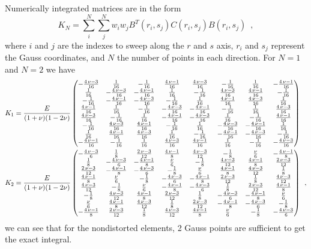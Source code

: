 \documentclass[12pt,letterpaper]{article}
\begin{document}
Numerically integrated matrices are in the form
\[ K_N = \sum_{i}^{N}\sum_{j}^{N} w_{i}w_{j}B^T(r_i,s_j) C(r_i,s_j) B(r_i,s_j) \enspace , \]
where $i$ and $j$ are the indexes to sweep along the $r$ and $s$ axis, $r_i$ and $s_j$ represent the Gauss coordinates, and $N$ the number of points in each direction. For $N=1$ and $N=2$ we have
\begin{align*}
K_1 &= \frac{E}{(1+\nu)(1-2\nu)}\begin{pmatrix}-\frac{4\,\nu-3}{16} & \frac{1}{16} & -\frac{1}{16} & \frac{4\,\nu-1}{16} & \frac{4\,\nu-3}{16} & -\frac{1}{16} & \frac{1}{16} & -\frac{4\,\nu-1}{16}\cr \frac{1}{16} & -\frac{4\,\nu-3}{16} & -\frac{4\,\nu-1}{16} & \frac{1}{16} & -\frac{1}{16} & \frac{4\,\nu-3}{16} & \frac{4\,\nu-1}{16} & -\frac{1}{16}\cr -\frac{1}{16} & -\frac{4\,\nu-1}{16} & -\frac{4\,\nu-3}{16} & -\frac{1}{16} & \frac{1}{16} & \frac{4\,\nu-1}{16} & \frac{4\,\nu-3}{16} & \frac{1}{16}\cr \frac{4\,\nu-1}{16} & \frac{1}{16} & -\frac{1}{16} & -\frac{4\,\nu-3}{16} & -\frac{4\,\nu-1}{16} & -\frac{1}{16} & \frac{1}{16} & \frac{4\,\nu-3}{16}\cr \frac{4\,\nu-3}{16} & -\frac{1}{16} & \frac{1}{16} & -\frac{4\,\nu-1}{16} & -\frac{4\,\nu-3}{16} & \frac{1}{16} & -\frac{1}{16} & \frac{4\,\nu-1}{16}\cr -\frac{1}{16} & \frac{4\,\nu-3}{16} & \frac{4\,\nu-1}{16} & -\frac{1}{16} & \frac{1}{16} & -\frac{4\,\nu-3}{16} & -\frac{4\,\nu-1}{16} & \frac{1}{16}\cr \frac{1}{16} & \frac{4\,\nu-1}{16} & \frac{4\,\nu-3}{16} & \frac{1}{16} & -\frac{1}{16} & -\frac{4\,\nu-1}{16} & -\frac{4\,\nu-3}{16} & -\frac{1}{16}\cr -\frac{4\,\nu-1}{16} & -\frac{1}{16} & \frac{1}{16} & \frac{4\,\nu-3}{16} & \frac{4\,\nu-1}{16} & \frac{1}{16} & -\frac{1}{16} & -\frac{4\,\nu-3}{16}\end{pmatrix}\\
K_2 &= \frac{E}{(1+\nu)(1-2\nu)}\begin{pmatrix}-\frac{4\,\nu-3}{6} & \frac{1}{8} & \frac{2\,\nu-3}{12} & \frac{4\,\nu-1}{8} & \frac{4\,\nu-3}{12} & -\frac{1}{8} & \frac{\nu}{6} & -\frac{4\,\nu-1}{8}\cr \frac{1}{8} & -\frac{4\,\nu-3}{6} & -\frac{4\,\nu-1}{8} & \frac{\nu}{6} & -\frac{1}{8} & \frac{4\,\nu-3}{12} & \frac{4\,\nu-1}{8} & \frac{2\,\nu-3}{12}\cr \frac{2\,\nu-3}{12} & -\frac{4\,\nu-1}{8} & -\frac{4\,\nu-3}{6} & -\frac{1}{8} & \frac{\nu}{6} & \frac{4\,\nu-1}{8} & \frac{4\,\nu-3}{12} & \frac{1}{8}\cr \frac{4\,\nu-1}{8} & \frac{\nu}{6} & -\frac{1}{8} & -\frac{4\,\nu-3}{6} & -\frac{4\,\nu-1}{8} & \frac{2\,\nu-3}{12} & \frac{1}{8} & \frac{4\,\nu-3}{12}\cr \frac{4\,\nu-3}{12} & -\frac{1}{8} & \frac{\nu}{6} & -\frac{4\,\nu-1}{8} & -\frac{4\,\nu-3}{6} & \frac{1}{8} & \frac{2\,\nu-3}{12} & \frac{4\,\nu-1}{8}\cr -\frac{1}{8} & \frac{4\,\nu-3}{12} & \frac{4\,\nu-1}{8} & \frac{2\,\nu-3}{12} & \frac{1}{8} & -\frac{4\,\nu-3}{6} & -\frac{4\,\nu-1}{8} & \frac{\nu}{6}\cr \frac{\nu}{6} & \frac{4\,\nu-1}{8} & \frac{4\,\nu-3}{12} & \frac{1}{8} & \frac{2\,\nu-3}{12} & -\frac{4\,\nu-1}{8} & -\frac{4\,\nu-3}{6} & -\frac{1}{8}\cr -\frac{4\,\nu-1}{8} & \frac{2\,\nu-3}{12} & \frac{1}{8} & \frac{4\,\nu-3}{12} & \frac{4\,\nu-1}{8} & \frac{\nu}{6} & -\frac{1}{8} & -\frac{4\,\nu-3}{6}\end{pmatrix} \enspace ,
\end{align*}
we can see that for the nondistorted elements, 2 Gauss points are sufficient to get the exact integral.
\end{document}
